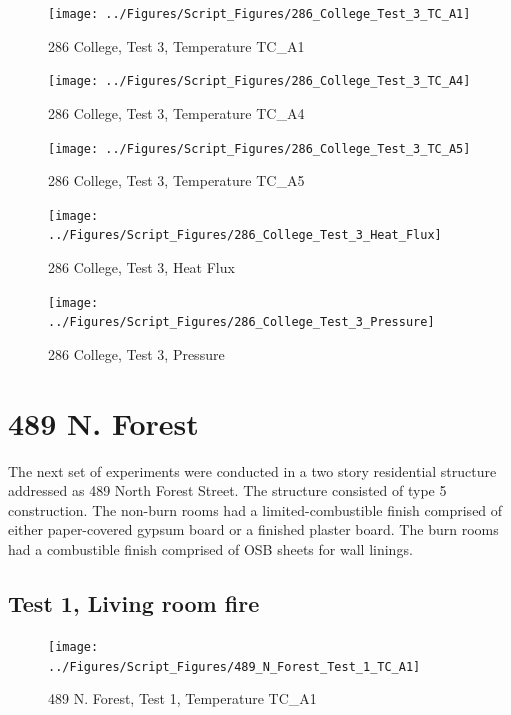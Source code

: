 \documentclass[12pt,oneside]{book}
\begin{document}
\begin{figure}[!ht]
\texttt{[image: ../Figures/Script\_Figures/286\_College\_Test\_3\_TC\_A1]}
\caption{286 College, Test 3, Temperature TC\_A1}
\label{fig:286_College_Test_3_TC_A1}
\end{figure}

\begin{figure}[!ht]
\texttt{[image: ../Figures/Script\_Figures/286\_College\_Test\_3\_TC\_A4]}
\caption{286 College, Test 3, Temperature TC\_A4}
\label{fig:286_College_Test_3_TC_A4}
\end{figure}

\begin{figure}[!ht]
\texttt{[image: ../Figures/Script\_Figures/286\_College\_Test\_3\_TC\_A5]}
\caption{286 College, Test 3, Temperature TC\_A5}
\label{fig:286_College_Test_3_TC_A5}
\end{figure}

\begin{figure}[!ht]
\texttt{[image: ../Figures/Script\_Figures/286\_College\_Test\_3\_Heat\_Flux]}
\caption{286 College, Test 3, Heat Flux}
\label{fig:286_College_Test_3_Heat_Flux}
\end{figure}

\begin{figure}[!ht]
\texttt{[image: ../Figures/Script\_Figures/286\_College\_Test\_3\_Pressure]}
\caption{286 College, Test 3, Pressure}
\label{fig:286_College_Test_3_Pressure}
\end{figure}


\clearpage


\section{489 N. Forest}

The next set of experiments were conducted in a two story residential structure addressed as 489 North Forest Street. The structure consisted of type 5 construction. The non-burn rooms had a limited-combustible finish comprised of either paper-covered gypsum board or a finished plaster board. The burn rooms had a combustible finish comprised of OSB sheets for wall linings.

\subsection{Test 1, Living room fire}

\begin{figure}[!ht]
\texttt{[image: ../Figures/Script\_Figures/489\_N\_Forest\_Test\_1\_TC\_A1]}
\caption{489 N. Forest, Test 1, Temperature TC\_A1}
\label{fig:489_N_Forest_Test_1_TC_A1}
\end{figure}
\end{document}
